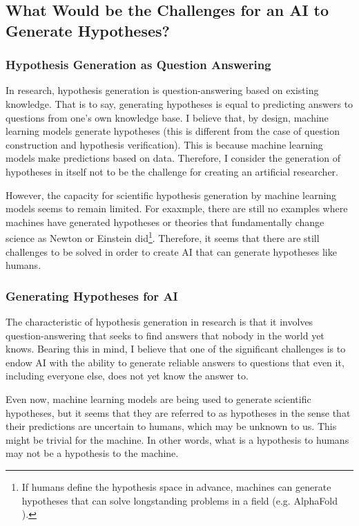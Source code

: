 \subsection{What Would be the Challenges for an AI to Generate Hypotheses?}
\subsubsection{Hypothesis Generation as Question Answering}
In research, hypothesis generation is question-answering based on existing knowledge. That is to say, generating hypotheses is equal to predicting answers to questions from one's own knowledge base. I believe that, by design, machine learning models generate hypotheses (this is different from the case of question construction and hypothesis verification). This is because machine learning models make predictions based on data. Therefore, I consider the generation of hypotheses in itself not to be the challenge for creating an artificial researcher.

However, the capacity for scientific hypothesis generation by machine learning models seems to remain limited. For exaxmple, there are still no examples where machines have generated hypotheses or theories that fundamentally change science as Newton or Einstein did\footnote{
If humans define the hypothesis space in advance, machines can generate hypotheses that can solve longstanding problems in a field (e.g. AlphaFold \cite{jumper2021highly}).
}. Therefore, it seems that there are still challenges to be solved in order to create AI that can generate hypotheses like humans.

\subsubsection{Generating Hypotheses for AI}
The characteristic of hypothesis generation in research is that it involves question-answering that seeks to find answers that nobody in the world yet knows. Bearing this in mind, I believe that one of the significant challenges is to endow AI with the ability to generate reliable answers to questions that even it, including everyone else, does not yet know the answer to.

Even now, machine learning models are being used to generate scientific hypotheses, but it seems that they are referred to as hypotheses in the sense that their predictions are uncertain to humans, which may be unknown to us. This might be trivial for the machine. In other words, what is a hypothesis to humans may not be a hypothesis to the machine. 


